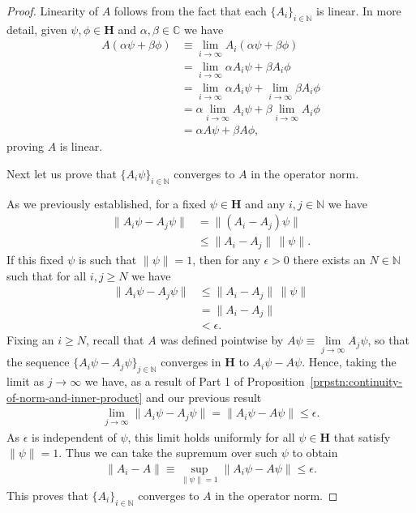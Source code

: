 \begin{proof}
Linearity of $A$ follows from the fact that each $\{A_i\}_{i \in \mathbb{N}}$ is linear. In more detail, given $\psi,\phi \in \mathbf{H}$ and $\alpha,\beta \in \mathbb{C}$ we have
\begin{align}
    A(\alpha\psi + \beta\phi) &\equiv \lim\limits_{i \rightarrow \infty} A_i (\alpha\psi + \beta\phi) \\
                              &= \lim\limits_{i \rightarrow \infty} \alpha A_i\psi + \beta A_i\phi \\
                              &= \lim\limits_{i \rightarrow \infty} \alpha A_i\psi + \lim\limits_{i \rightarrow \infty} \beta A_i\phi \\
                              &= \alpha \lim\limits_{i \rightarrow \infty} A_i\psi + \beta \lim\limits_{i \rightarrow \infty} A_i\phi \\
                              &= \alpha A\psi + \beta A\phi,
\end{align}
proving $A$ is linear.

Next let us prove that $\{A_i\psi\}_{i \in \mathbb{N}}$ converges to $A$ in the operator norm.

As we previously established, for a fixed $\psi \in \mathbf{H}$ and any $i,j \in \mathbb{N}$ we have
\begin{align}
    \|A_i\psi - A_j\psi\| &= \|(A_i - A_j)\psi\| \\
                          &\le \|A_i - A_j\| \, \|\psi\|.
\end{align}
If this fixed $\psi$ is such that $\|\psi\| = 1$, then for any $\epsilon > 0$ there exists an $N \in \mathbb{N}$ such that for all $i,j \ge N$ we have
\begin{align}
    \|A_i\psi - A_j\psi\| &\le \|A_i - A_j\| \, \|\psi\| \\
                          &= \|A_i - A_j\| \\
                          &< \epsilon.
\end{align}
Fixing an $i \ge N$, recall that $A$ was defined pointwise by $A\psi \equiv \lim\limits_{j \rightarrow \infty} A_j\psi$, so that the sequence $\{ A_i\psi - A_j\psi \}_{j \in \mathbb{N}}$ converges in $\mathbf{H}$ to $A_i\psi - A\psi$. Hence, taking the limit as $j \rightarrow \infty$ we have, as a result of Part 1 of Proposition~\ref{prpstn:continuity-of-norm-and-inner-product} and our previous result
\begin{align}
    \lim\limits_{j \rightarrow \infty} \|A_i\psi - A_j\psi\| = \|A_i\psi - A\psi\| \le \epsilon.
\end{align}
As $\epsilon$ is independent of $\psi$, this limit holds uniformly for all $\psi \in \mathbf{H}$ that satisfy $\|\psi\| = 1$. Thus we can take the supremum over such $\psi$ to obtain
\begin{align}
    \|A_i - A\| \equiv \sup\limits_{\|\psi\| = 1} \|A_i\psi - A\psi\| \le \epsilon.
\end{align}
This proves that $\{A_i\}_{i \in \mathbb{N}}$ converges to $A$ in the operator norm.


\end{proof}
